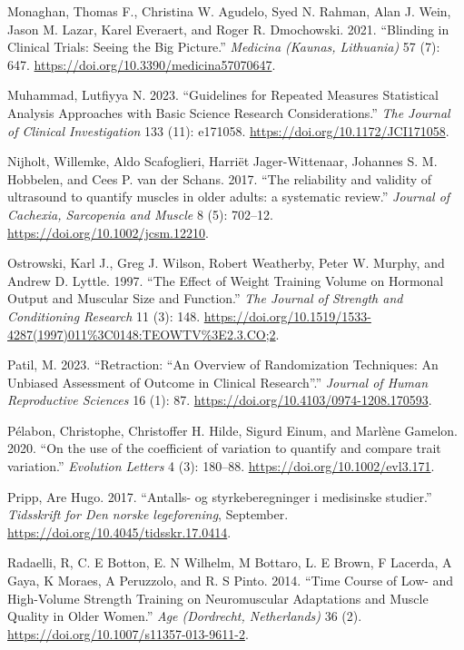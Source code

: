 \documentclass[
  letterpaper,
  DIV=11,
  numbers=noendperiod]{scrreprt}
\newlength{\cslhangindent}
\newlength{\cslentryspacingunit} %
\newenvironment{CSLReferences}[2] %
 {%
  \setlength{\parindent}{0pt}
  \ifodd #1
  \let\oldpar\par
  \def\par{\hangindent=\cslhangindent\oldpar}
  \fi
  \setlength{\parskip}{#2\cslentryspacingunit}
 }%
 {}
\begin{document}
\begin{CSLReferences}{1}{0}
\leavevmode{}%
Monaghan, Thomas F., Christina W. Agudelo, Syed N. Rahman, Alan J. Wein,
Jason M. Lazar, Karel Everaert, and Roger R. Dmochowski. 2021.
{``Blinding in Clinical Trials: Seeing the Big Picture.''}
\emph{Medicina (Kaunas, Lithuania)} 57 (7): 647.
\url{https://doi.org/10.3390/medicina57070647}.

\leavevmode{}%
Muhammad, Lutfiyya N. 2023. {``Guidelines for Repeated Measures
Statistical Analysis Approaches with Basic Science Research
Considerations.''} \emph{The Journal of Clinical Investigation} 133
(11): e171058. \url{https://doi.org/10.1172/JCI171058}.

\leavevmode{}%
Nijholt, Willemke, Aldo Scafoglieri, Harriët Jager-Wittenaar, Johannes
S. M. Hobbelen, and Cees P. van der Schans. 2017. {``The reliability and
validity of ultrasound to quantify muscles in older adults: a systematic
review.''} \emph{Journal of Cachexia, Sarcopenia and Muscle} 8 (5):
702--12. \url{https://doi.org/10.1002/jcsm.12210}.

\leavevmode{}%
Ostrowski, Karl J., Greg J. Wilson, Robert Weatherby, Peter W. Murphy,
and Andrew D. Lyttle. 1997. {``The Effect of Weight Training Volume on
Hormonal Output and Muscular Size and Function.''} \emph{The Journal of
Strength and Conditioning Research} 11 (3): 148.
\url{https://doi.org/10.1519/1533-4287(1997)011\%3C0148:TEOWTV\%3E2.3.CO;2}.

\leavevmode{}%
Patil, M. 2023. {``Retraction: {``}An Overview of Randomization
Techniques: An Unbiased Assessment of Outcome in Clinical
Research{''}.''} \emph{Journal of Human Reproductive Sciences} 16 (1):
87. \url{https://doi.org/10.4103/0974-1208.170593}.

\leavevmode{}%
Pélabon, Christophe, Christoffer H. Hilde, Sigurd Einum, and Marlène
Gamelon. 2020. {``On the use of the coefficient of variation to quantify
and compare trait variation.''} \emph{Evolution Letters} 4 (3): 180--88.
\url{https://doi.org/10.1002/evl3.171}.

\leavevmode{}%
Pripp, Are Hugo. 2017. {``Antalls- og styrkeberegninger i medisinske
studier.''} \emph{Tidsskrift for Den norske legeforening}, September.
\url{https://doi.org/10.4045/tidsskr.17.0414}.

\leavevmode{}%
Radaelli, R, C. E Botton, E. N Wilhelm, M Bottaro, L. E Brown, F
Lacerda, A Gaya, K Moraes, A Peruzzolo, and R. S Pinto. 2014. {``Time
Course of Low- and High-Volume Strength Training on Neuromuscular
Adaptations and Muscle Quality in Older Women.''} \emph{Age (Dordrecht,
Netherlands)} 36 (2). \url{https://doi.org/10.1007/s11357-013-9611-2}.


\end{CSLReferences}
\end{document}
